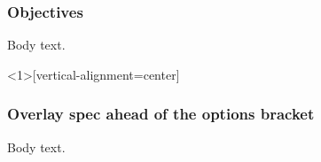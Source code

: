 \documentclass{ltx-talk}
\begin{document}
\begin{frame}[vertical-alignment=center]
\frametitle{Objectives}
Body text.
\end{frame}

\begin{frame}<1>[vertical-alignment=center]
\frametitle{Overlay spec ahead of the options bracket}
Body text.
\end{frame}
\end{document}
